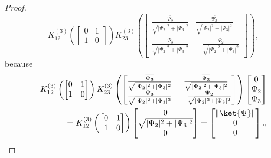 \documentclass[a4paper,11pt]{article}
\begin{document}
\begin{appendices}
\begin{proof}
  $$
  K_{12}^{(3)}\left( \begin{bmatrix} 0 & 1 \\ 1 & 0 \end{bmatrix}\right)K_{23}^{(3)}\left(\begin{bmatrix}
    \frac{\overline{\Psi_2}}{\sqrt{ |\Psi_2|^2+|\Psi_3|^2}} & \frac{\overline{\Psi_3}}{\sqrt{ |\Psi_2|^2+|\Psi_3|^2}} \\
    \frac{\Psi_3}{\sqrt{ |\Psi_2|^2+|\Psi_3|^2}} & -\frac{\Psi_2}{\sqrt{ |\Psi_2|^2+|\Psi_3|^2}} \end{bmatrix} \right),
  $$
  because
  \begin{align*}
  K_{12}^{(3)}\left( \begin{bmatrix} 0 & 1 \\ 1 & 0 \end{bmatrix}\right)K_{23}^{(3)}\left(\begin{bmatrix}
    \frac{\overline{\Psi_2}}{\sqrt{ |\Psi_2|^2+|\Psi_3|^2}} & \frac{\overline{\Psi_3}}{\sqrt{ |\Psi_2|^2+|\Psi_3|^2}} \\
    \frac{\Psi_3}{\sqrt{ |\Psi_2|^2+|\Psi_3|^2}} & -\frac{\Psi_2}{\sqrt{ |\Psi_2|^2+|\Psi_3|^2}} \end{bmatrix} \right)\begin{bmatrix} 0 \\ \Psi_2 \\ \Psi_3 \end{bmatrix} \\ 
      = K_{12}^{(3)}\left( \begin{bmatrix} 0 & 1 \\ 1 & 0 \end{bmatrix}\right) \begin{bmatrix} 0\\ \sqrt{ |\Psi_2|^2+|\Psi_3|^2}\\ 0 \end{bmatrix} = \begin{bmatrix} \|\ket{\Psi}\| \\ 0\\ 0 \end{bmatrix}.,
  \end{align*}
  

\end{proof}
\end{appendices}
\end{document}
